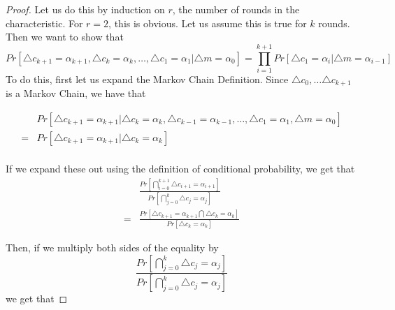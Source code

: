 \documentclass[12pt,a4paper]{article}
\begin{document}
\begin{proof}
Let us do this by induction on $r$, the number of rounds in the characteristic. For $r=2$, this is
obvious. Let us assume this is true for $k$ rounds. Then we want to show that
\[Pr[\triangle c_{k+1} = \alpha_{k+1}, \triangle c_{k} = \alpha_{k},
\ldots,\triangle c_1 = \alpha_1 | \triangle m = \alpha_0] = \prod_{i=1}^{k+1}
Pr[\triangle c_1 = \alpha_i | \triangle m = \alpha_{i-1}] \]
To do this, first let us expand the Markov Chain Definition. Since $\triangle
c_0, \ldots \triangle c_{k+1}$ is a Markov Chain, we have that

\begin{align*}
&Pr[\triangle c_{k+1} = \alpha_{k+1} | \triangle c_k = \alpha_k, \triangle c_{k-1}
= \alpha_{k-1}, \ldots, \triangle c_1 = \alpha_1, \triangle m = \alpha_0]\\
=& Pr[\triangle c_{k+1} =
\alpha_{k+1} | \triangle c_k = \alpha_k] \\ 
\end{align*}

If we expand these out using the definition of conditional probability, we get
that
\begin{align*}
&\frac{
Pr[\bigcap^{k+1}_{i=0}\triangle c_{i+1} = \alpha_{i+1}]}{Pr[\bigcap_{j=0}^k
 \triangle c_j = \alpha_j]}\\
=& \frac{Pr[\triangle c_{k+1} = \alpha_{k+1} \bigcap \triangle c_{k} =
\alpha_k]}{Pr[\triangle c_k = \alpha_k]} 
\end{align*}

Then, if we multiply both sides of the equality by 
\[\frac{Pr[\bigcap_{j=0}^k \triangle c_j = \alpha_j]}{Pr[\bigcap_{j=0}^k
 \triangle c_j = \alpha_j]}\] we get that


\end{proof}
\end{document}
